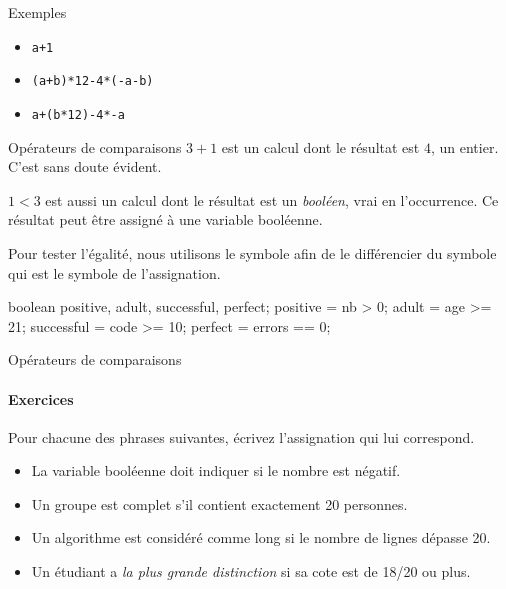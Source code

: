 \begin{frame}[fragile]{Exemples}
  \begin{itemize}[<+->]
    \item \Verb_a+1_
    \item \Verb_(a+b)*12-4*(-a-b)_
    \item \Verb_a+(b*12)-4*-a_
  \end{itemize}
\end{frame}

\begin{frame}[fragile]{Opérateurs de comparaisons}
  $3+1$ est un calcul dont le résultat est $4$, un entier. C'est sans
  doute évident.

  $1<3$ est aussi un calcul dont le résultat est un \emph{booléen},
  vrai en l’occurrence.  Ce résultat peut être assigné à une variable
  booléenne.

  Pour tester l'égalité, nous utilisons le symbole \pc{==} afin de le
  différencier du symbole \pc{=} qui est le symbole de l'assignation.

  \begin{java}
boolean positive, adult, successful, perfect;
positive = nb > 0;
adult = age >= 21;
successful = code >= 10;
perfect = errors == 0;
\end{java}
\end{frame}


\begin{frame}{Opérateurs de comparaisons}
  \framesubtitle{Exercices}
  Pour chacune des phrases suivantes,
  écrivez l’assignation qui lui correspond.
  \begin{itemize}
  \item 
    La variable booléenne 
    doit indiquer si le nombre  est négatif.
  \item
    Un groupe est complet s’il contient exactement 20 personnes.
  \item
    Un algorithme est considéré comme long si le nombre de lignes
    dépasse 20.
  \item 
    Un étudiant a \emph{la plus grande distinction} si sa cote est
    de 18/20 ou plus.
  \end{itemize}
\end{frame}

